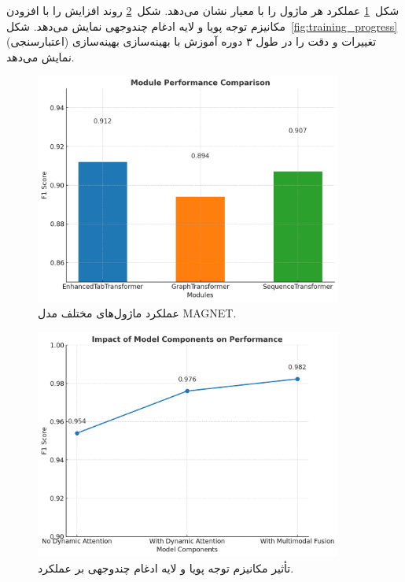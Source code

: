 شکل~\ref{fig:module_comparison} عملکرد هر ماژول را با معیار  نشان می‌دهد. شکل~\ref{fig:ablation_study} روند افزایش  را با افزودن مکانیزم توجه پویا و لایه ادغام چندوجهی نمایش می‌دهد. شکل~\ref{fig:training_progress} تغییرات  و دقت را در طول ۳ دوره آموزش با بهینه‌سازی بهینه‌سازی (اعتبارسنجی) نمایش می‌دهد.

\begin{figure}[h!]
\centering
\includegraphics[width=0.9\textwidth]{images/fig_module_comparison_en}
    \caption{عملکرد ماژول‌های مختلف مدل MAGNET.}
\label{fig:module_comparison}
\end{figure}

\begin{figure}[h!]
\centering
\includegraphics[width=0.9\textwidth]{images/fig_ablation_study_en}
    \caption{تأثیر مکانیزم توجه پویا و لایه ادغام چندوجهی بر عملکرد.}
\label{fig:ablation_study}
\end{figure}

